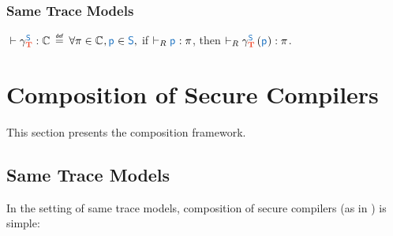 \documentclass[a4paper,12pt]{article}
\begin{document}
\subsubsection{Same Trace Models}

\begin{definition}{}
  \begin{center}
    $\rtp{\ccST}{\varClass}$
    $\isdef$
    $\forall \varProperty\in\varClass, \srcComponent\in\src{S},$ %
    if $\rsat{\srcComponent}{\varProperty}$,
    then $\rsat{\ccST\lrpars{\srcComponent}}{\varProperty}$.
  \end{center}
\end{definition}

\section{Composition of Secure Compilers}\label{sec:rtpc}

This section presents the composition framework.

\subsection{Same Trace Models}\label{subsec:rtpc-same-trace-models}

In the setting of same trace models, composition of secure compilers (as in ) is simple:
\end{document}
